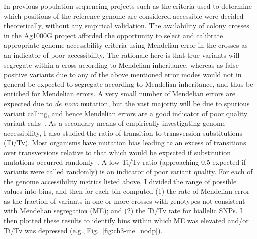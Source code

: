 \begin{refsection}
In previous population sequencing projects such as \textcite{1000G2015} the criteria used to determine which positions of the reference genome are considered accessible were decided theoretically, without any empirical validation.
%
The availability of colony crosses in the Ag1000G project afforded the opportunity to select and calibrate appropriate genome accessibility criteria using Mendelian error in the crosses as an indicator of poor accessibility.
%
The rationale here is that true variants will segregate within a cross according to Mendelian inheritance, whereas as false positive variants due to any of the above mentioned error modes would not in general be expected to segregate according to Mendelian inheritance, and thus be enriched for Mendelian errors.
%
A very small number of Mendelian errors are expected due to \textit{de novo} mutation, but the vast majority will be due to spurious variant calling, and hence Mendelian errors are a good indicator of poor quality variant calls~\parencite{Saunders2007,Laurie2010,Pilipenko2014}.
%
As a secondary means of empirically investigating genome accessibility, I also studied the ratio of transition to transversion substitutions (Ti/Tv).
%
Most organisms have mutation bias leading to an excess of transitions over transversions relative to that which would be expected if substitution mutations occurred randomly~\parencite{Guo2013}.
%
A low Ti/Tv ratio (approaching 0.5 expected if variants were called randomly) is an indicator of poor variant quality.
%
For each of the genome accessibility metrics listed above, I divided the range of possible values into bins, and then for each bin computed (1) the rate of Mendelian error as the fraction of variants in one or more crosses with genotypes not consistent with Mendelian segregation (ME); and (2) the Ti/Tv rate for biallelic SNPs.
%
I then plotted these results to identify bins within which ME was elevated and/or Ti/Tv was depressed (e.g., Fig.~\ref{fig:ch3-me_nodp}).



\end{refsection}
